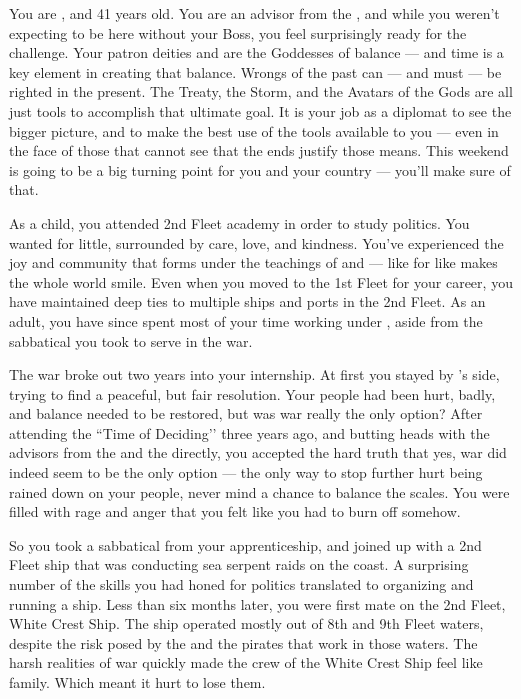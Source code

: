 \documentclass[char]{GL2020}
\begin{document}
\name{\cJuniorStatesman{}}

You are \cJuniorStatesman{\intro}, and 41 years old. You are an advisor from the \pShip{}, and while you weren't expecting to be here without your Boss, you feel surprisingly ready for the challenge. Your patron deities \cEbbFull{\full} and \cFlowFull{\full} are the Goddesses of balance — and time is a key element in creating that balance. Wrongs of the past can — and must — be righted in the present. The Treaty, the Storm, and the Avatars of the Gods are all just tools to accomplish that ultimate goal. It is your job as a diplomat to see the bigger picture, and to make the best use of the tools available to you — even in the face of those that cannot see that the ends justify those means. This weekend is going to be a big turning point for you and your country — you'll make sure of that.

As a child, you attended 2nd Fleet academy in order to study politics. You wanted for little, surrounded by care, love, and kindness. You’ve experienced the joy and community that forms under the teachings of \cEbb{} and \cFlow{} — like for like makes the whole world smile. Even when you moved to the 1st Fleet for your career, you have maintained deep ties to multiple ships and ports in the 2nd Fleet. As an adult, you have since spent most of your time working under \cHeadDiplomat{\full}, aside from the sabbatical you took to serve in the war. 

The war broke out two years into your internship. At first you stayed by \cHeadDiplomat{}’s side, trying to find a peaceful, but fair resolution. Your people had been hurt, badly, and balance needed to be restored, but was war really the only option? After attending the ``Time of Deciding’’ three years ago, and butting heads with the advisors from the \pFarm{} and the \pTech{} directly, you accepted the hard truth that yes, war did indeed seem to be the only option — the only way to stop further hurt being rained down on your people, never mind a chance to balance the scales. You were filled with rage and anger that you felt like you had to burn off somehow.

So you took a sabbatical from your apprenticeship, and joined up with a 2nd Fleet ship that was conducting sea serpent raids on the \pFarm{} coast. A surprising number of the skills you had honed for politics translated to organizing and running a ship. Less than six months later, you were first mate on the 2nd Fleet, White Crest Ship. The ship operated mostly out of 8th and 9th Fleet waters, despite the risk posed by the \pWod{} and the pirates that work in those waters. The harsh realities of war quickly made the crew of the White Crest Ship feel like family. Which meant it hurt to lose them. 
\end{document}
